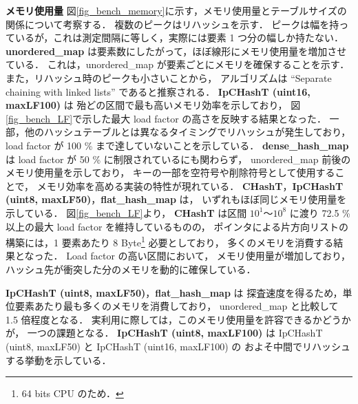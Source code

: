 %
{\bf メモリ使用量}
\samepage\newline\indent
図\ref{fig_bench_memory}に示す，メモリ使用量とテーブルサイズの関係について考察する．
複数のピークはリハッシュを示す．
ピークは幅を持っているが，これは測定間隔に等しく，実際には要素 1 つ分の幅しか持たない．
{\bf unordered\_map} は要素数にしたがって，ほぼ線形にメモリ使用量を増加させている．
これは，unordered\_map が要素ごとにメモリを確保することを示す．
また，リハッシュ時のピークも小さいことから，
アルゴリズムは ``Separate chaining with linked lists'' であると推察される．
{\bf IpCHashT (uint16, maxLF100)} は
殆どの区間で最も高いメモリ効率を示しており，
図\ref{fig_bench_LF}で示した最大 load factor の高さを反映する結果となった．
一部，他のハッシュテーブルとは異なるタイミングでリハッシュが発生しており，
load factor が 100 \% まで達していないことを示している．
{\bf dense\_hash\_map} は
load factor が 50 \% に制限されているにも関わらず，
unordered\_map 前後のメモリ使用量を示しており，
キーの一部を空符号や削除符号として使用することで，
メモリ効率を高める実装の特性が現れている．
{\bf CHashT}，{\bf IpCHashT (uint8, maxLF50)}，{\bf flat\_hash\_map} は，
いずれもほぼ同じメモリ使用量を示している．
図\ref{fig_bench_LF}より，
{\bf CHashT} は区間 $10^1〜10^8$ に渡り 72.5 \% 以上の最大 load factor を維持しているものの，
ポインタによる片方向リストの構築には，1 要素あたり 8 Byte\footnote{64 bits CPU のため．} 必要としており，
多くのメモリを消費する結果となった．
Load factor の高い区間において，
メモリ使用量が増加しており，
ハッシュ先が衝突した分のメモリを動的に確保している．

\noindent
{\bf IpCHashT (uint8, maxLF50)}，{\bf flat\_hash\_map} は
探査速度を得るため，単位要素あたり最も多くのメモリを消費しており，
unordered\_map と比較して 1.5 倍程度となる．
実利用に際しては，このメモリ使用量を許容できるかどうかが，
一つの課題となる．
{\bf IpCHashT (uint8, maxLF100)} は
IpCHashT (uint8, maxLF50) と IpCHashT (uint16, maxLF100) の
およそ中間でリハッシュする挙動を示している．

